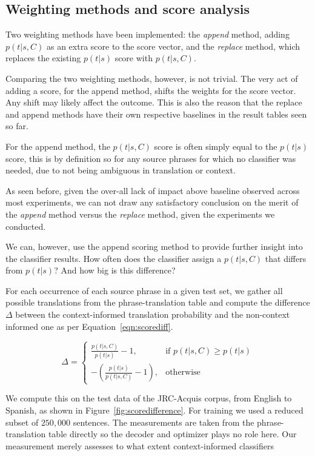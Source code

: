 \subsection{Weighting methods and score analysis}
\label{sec:weighting}

Two weighting methods have been implemented: the \emph{append} method, adding
$p(t|s,C)$ as an extra score to the score vector, and the \emph{replace}
method, which replaces the existing $p(t|s)$ score with $p(t|s,C)$.

Comparing the two weighting methods, however, is not trivial.  The very act of
adding a score, for the append method, shifts the weights for the score vector.
Any shift may likely affect the outcome. This is also the reason that the
replace and append methods have their own respective baselines in the result
tables seen so far.

For the append method, the $p(t|s,C)$ score is often simply
equal to the $p(t|s)$ score, this is by definition so for any source phrases for which no
classifier was needed, due to not being ambiguous in translation or context. 

As seen before, given the over-all lack of impact above baseline observed across most
experiments, we can not draw any satisfactory conclusion on the merit of the
\emph{append} method versus the \emph{replace} method, given the experiments we
conducted.

We can, however, use the append scoring method to provide further insight into
the classifier results. How often does the classifier assign a $p(t|s,C)$ that
differs from $p(t|s)$? And how big is this difference?

For each occurrence of each source phrase in a given test set, we gather all
possible translations from the phrase-translation table and compute the
difference $\Delta$ between the context-informed translation probability and
the non-context informed one as per Equation~\ref{eqn:scorediff}.

\begin{equation}
  \Delta = 
\begin{cases}
 \frac{p(t|s,C)}{p(t|s)} - 1, & \text{if } p(t|s,C) \geq p(t|s)  \\
 -(\frac{p(t|s)}{p(t|s,C)} - 1), & \text{otherwise}
\end{cases}
\label{eqn:scorediff}
\end{equation}


We compute this on the test data of the JRC-Acquis corpus,
from English to Spanish, as shown in Figure~\ref{fig:scoredifference}. For
training we used a reduced subset of $250,000$ sentences. The measurements are taken
from the phrase-translation table directly so the decoder and optimizer plays
no role here. Our measurement merely assesses to what extent context-informed classifiers


